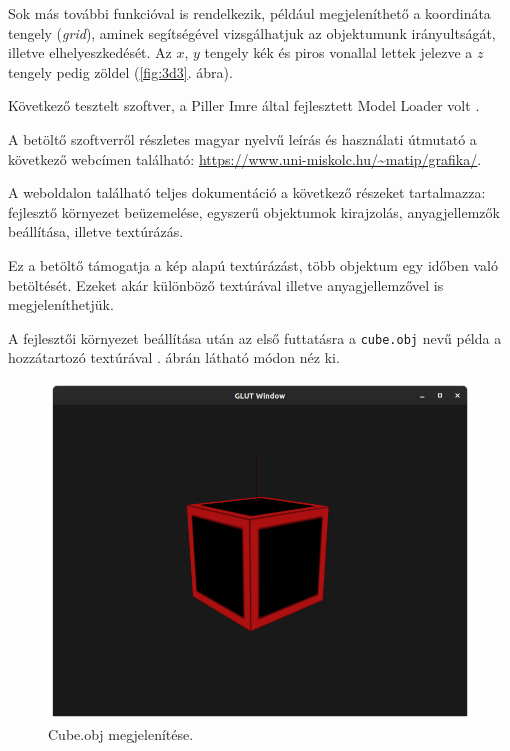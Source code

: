Sok más további funkcióval is rendelkezik, például megjeleníthető a koordináta tengely (\textit{grid}), aminek segítségével vizsgálhatjuk az objektumunk irányultságát, illetve elhelyeszkedését. Az $x$, $y$ tengely kék és piros vonallal lettek jelezve a $z$ tengely pedig zöldel  (\ref{fig:3d3}. ábra).
\newpage
{}

Következő tesztelt szoftver, a Piller Imre által fejlesztett Model Loader volt \cite{imre2020model}.

A betöltő szoftverről részletes magyar nyelvű leírás és használati útmutató a következő webcímen található: \url{https://www.uni-miskolc.hu/~matip/grafika/}.

A weboldalon található teljes dokumentáció a következő részeket tartalmazza: fejlesztő környezet beüzemelése, egyszerű objektumok kirajzolás, anyagjellemzők beállítása, illetve textúrázás.

Ez a betöltő támogatja a kép alapú textúrázást, több objektum egy időben való betöltését. Ezeket akár különböző textúrával illetve anyagjellemzővel is megjeleníthetjük.

A fejlesztői környezet beállítása után az első futtatásra a \texttt{cube.obj} nevű példa a hozzátartozó textúrával . ábrán látható módon néz ki.

\begin{figure}[h]
\centering
\includegraphics[width=\textwidth]{images/Model_loader.png}
\caption{Cube.obj megjelenítése.}
\label{fig:model1}
\end{figure}

